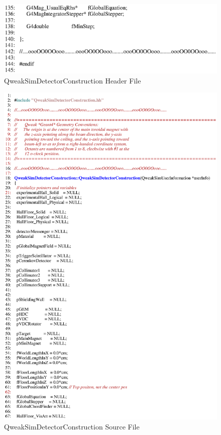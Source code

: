 \begin{figure}[ht]
  \hspace{0cm}
  \includegraphics[scale=0.8]{./figures4/QweakSimDetectorConstruction.hh-p3.eps}
  \caption{QweakSimDetectorConstruction Header File}
           \label{fig:IV-SC-3}
\end{figure}
\clearpage

\begin{figure}[ht]
  \hspace{0cm}
  \includegraphics[scale=0.8]{./figures4/QweakSimDetectorConstruction.cc-p1.eps}
  \caption{QweakSimDetectorConstruction Source File}
           \label{fig:V-SC-5}
\end{figure}
\clearpage

